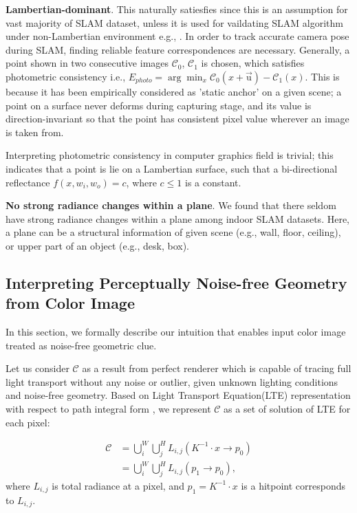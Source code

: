 \noindent \textbf{Lambertian-dominant}. 
This naturally satiesfies since this is an assumption for vast majority of SLAM dataset, unless it is used for vaildating SLAM algorithm under non-Lambertian environment e.g., . 
In order to track accurate camera pose during SLAM, finding reliable feature correspondences are necessary.
Generally, a point shown in two consecutive images $\mathcal{C}_0$, $\mathcal{C}_1$ is chosen, which satisfies photometric consistency i.e., $E_{photo}=\arg\min_x \mathcal{C}_0\left(x+\overrightarrow{\mathrm{u}}\right)-\mathcal{C}_1\left(x\right)$. 
This is because it has been empirically considered as 'static anchor' on a given scene; a point on a surface never deforms during capturing stage, and its value is direction-invariant so that the point has consistent pixel value wherever an image is taken from. 

Interpreting photometric consistency in computer graphics field is trivial; this indicates that a point is lie on a Lambertian surface, such that a bi-directional reflectance $f(x, w_i, w_o)=c$, where $c\le 1$ is a constant.


\noindent \textbf{No strong radiance changes within a plane}. 
We found that there seldom have strong radiance changes within a plane among indoor SLAM datasets. 
Here, a plane can be a structural information of given scene (e.g., wall, floor, ceiling), or upper part of an object (e.g., desk, box).


\subsection{Interpreting Perceptually Noise-free Geometry from Color Image}
In this section, we formally describe our intuition that enables input color image treated as noise-free geometric clue.

Let us consider $\mathcal{C}$ as a result from perfect renderer which is capable of tracing full light transport without any noise or outlier, given unknown lighting conditions and noise-free geometry. 
Based on Light Transport Equation(LTE) representation with respect to path integral form \cite{veach1998robust}, we represent $\mathcal{C}$ as a set of solution of LTE for each pixel:

\begin{align}
    \mathcal{C} & = \bigcup_i^W \bigcup_j^H L_{i,j}\left(K^{-1}\cdot x\rightarrow p_0\right) \nonumber \\
    & = \bigcup_i^W \bigcup_j^H L_{i,j}\left(p_1\rightarrow p_0\right),
\end{align}
where $L_{i,j}$ is total radiance at a pixel, and $p_1=K^{-1}\cdot x$ is a hitpoint corresponds to $L_{i,j}$.

